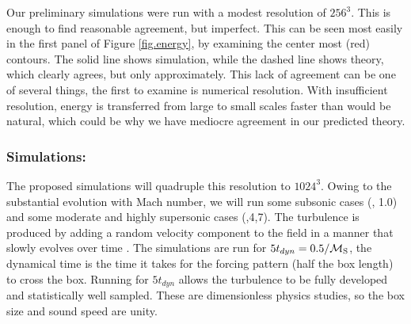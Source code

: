Our preliminary simulations were run with a modest resolution of $256^3$.  This
is enough to find reasonable agreement, but imperfect. This can be seen most
easily in the first panel of Figure \ref{fig.energy}, by examining the center
most (red) contours. The solid line shows simulation, while the dashed line
shows theory, which clearly agrees, but only approximately.  This lack of
agreement can be one of several things, the first to examine is numerical
resolution.  With insufficient resolution, energy is transferred from large to
small scales faster than would be natural, which could be why we have mediocre
agreement in our predicted theory.  

\subsubsection{Simulations: \nameTurbulence}
\label{subsec.turb_sims}

The proposed simulations will quadruple this
resolution to $1024^3$.  Owing to the substantial evolution with Mach number, we
will run some subsonic cases (, 1.0) and some moderate and highly
supersonic cases (,4,7).  The turbulence is produced by adding a random
velocity component to the field in a manner that slowly evolves over time
\citep{Schmidt09}.  The simulations are run for $5 t_{dyn} = 0.5/\mathcal{M_{\rm{S}}}$, the
dynamical time is the time it takes for the forcing pattern (half the box
length) to cross the box.  Running for $5 t_{dyn}$ allows the turbulence to be
fully developed and statistically well sampled.  These are dimensionless physics
studies, so the box size and sound speed are unity.
